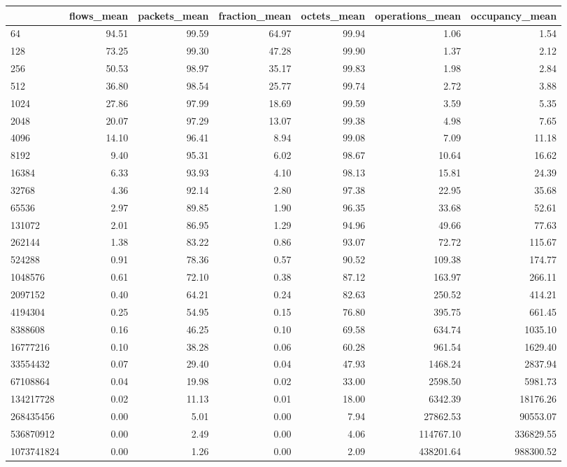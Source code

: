 \begin{tabular}{lrrrrrr}
\toprule
 & flows_mean & packets_mean & fraction_mean & octets_mean & operations_mean & occupancy_mean \\
\midrule
64 & 94.51 & 99.59 & 64.97 & 99.94 & 1.06 & 1.54 \\
128 & 73.25 & 99.30 & 47.28 & 99.90 & 1.37 & 2.12 \\
256 & 50.53 & 98.97 & 35.17 & 99.83 & 1.98 & 2.84 \\
512 & 36.80 & 98.54 & 25.77 & 99.74 & 2.72 & 3.88 \\
1024 & 27.86 & 97.99 & 18.69 & 99.59 & 3.59 & 5.35 \\
2048 & 20.07 & 97.29 & 13.07 & 99.38 & 4.98 & 7.65 \\
4096 & 14.10 & 96.41 & 8.94 & 99.08 & 7.09 & 11.18 \\
8192 & 9.40 & 95.31 & 6.02 & 98.67 & 10.64 & 16.62 \\
16384 & 6.33 & 93.93 & 4.10 & 98.13 & 15.81 & 24.39 \\
32768 & 4.36 & 92.14 & 2.80 & 97.38 & 22.95 & 35.68 \\
65536 & 2.97 & 89.85 & 1.90 & 96.35 & 33.68 & 52.61 \\
131072 & 2.01 & 86.95 & 1.29 & 94.96 & 49.66 & 77.63 \\
262144 & 1.38 & 83.22 & 0.86 & 93.07 & 72.72 & 115.67 \\
524288 & 0.91 & 78.36 & 0.57 & 90.52 & 109.38 & 174.77 \\
1048576 & 0.61 & 72.10 & 0.38 & 87.12 & 163.97 & 266.11 \\
2097152 & 0.40 & 64.21 & 0.24 & 82.63 & 250.52 & 414.21 \\
4194304 & 0.25 & 54.95 & 0.15 & 76.80 & 395.75 & 661.45 \\
8388608 & 0.16 & 46.25 & 0.10 & 69.58 & 634.74 & 1035.10 \\
16777216 & 0.10 & 38.28 & 0.06 & 60.28 & 961.54 & 1629.40 \\
33554432 & 0.07 & 29.40 & 0.04 & 47.93 & 1468.24 & 2837.94 \\
67108864 & 0.04 & 19.98 & 0.02 & 33.00 & 2598.50 & 5981.73 \\
134217728 & 0.02 & 11.13 & 0.01 & 18.00 & 6342.39 & 18176.26 \\
268435456 & 0.00 & 5.01 & 0.00 & 7.94 & 27862.53 & 90553.07 \\
536870912 & 0.00 & 2.49 & 0.00 & 4.06 & 114767.10 & 336829.55 \\
1073741824 & 0.00 & 1.26 & 0.00 & 2.09 & 438201.64 & 988300.52 \\
\bottomrule
\end{tabular}
